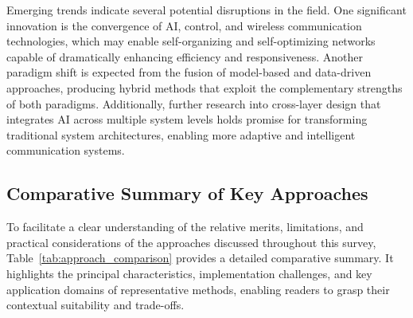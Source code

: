 \documentclass[sigconf]{acmart}
\begin{document}
Emerging trends indicate several potential disruptions in the field. One significant innovation is the convergence of AI, control, and wireless communication technologies, which may enable self-organizing and self-optimizing networks capable of dramatically enhancing efficiency and responsiveness. Another paradigm shift is expected from the fusion of model-based and data-driven approaches, producing hybrid methods that exploit the complementary strengths of both paradigms. Additionally, further research into cross-layer design that integrates AI across multiple system levels holds promise for transforming traditional system architectures, enabling more adaptive and intelligent communication systems.

\subsection{Comparative Summary of Key Approaches}

To facilitate a clear understanding of the relative merits, limitations, and practical considerations of the approaches discussed throughout this survey, Table~\ref{tab:approach_comparison} provides a detailed comparative summary. It highlights the principal characteristics, implementation challenges, and key application domains of representative methods, enabling readers to grasp their contextual suitability and trade-offs.
\end{document}
